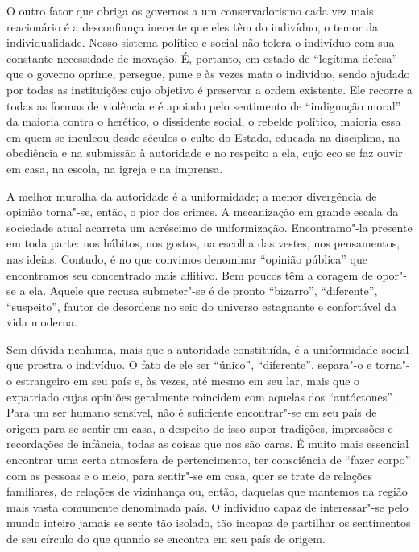 O outro fator que obriga os governos a um conservadorismo cada vez mais
reacionário é a desconfiança inerente que eles têm do indivíduo, o
temor da individualidade. Nosso sistema político e social não tolera o
indivíduo com sua constante necessidade de inovação. É, portanto, em
estado de “legítima defesa” que o governo oprime, persegue, pune e às
vezes mata o indivíduo, sendo ajudado por todas as instituições cujo
objetivo é preservar a ordem existente. Ele recorre a todas as formas
de violência e é apoiado pelo sentimento de “indignação moral” da
maioria contra o herético, o dissidente social, o rebelde político,
maioria essa em quem se inculcou desde séculos o culto do Estado,
educada na disciplina, na obediência e na submissão à autoridade e no
respeito a ela, cujo eco se faz ouvir em casa, na escola, na igreja e
na imprensa.

A melhor muralha da autoridade é a uniformidade; a menor divergência de
opinião torna"-se, então, o pior dos crimes. A mecanização em grande
escala da sociedade atual acarreta um acréscimo de uniformização.
Encontramo"-la presente em toda parte: nos hábitos, nos gostos, na
escolha das vestes, nos pensamentos, nas ideias. Contudo, é no que
convimos denominar “opinião pública” que encontramos seu concentrado
mais aflitivo. Bem poucos têm a coragem de opor"-se a ela. Aquele que
recusa submeter"-se é de pronto “bizarro”, “diferente”, “suspeito”,
fautor de desordens no seio do universo estagnante e confortável da
vida moderna.

Sem dúvida nenhuma, mais que a autoridade constituída, é a
uniformidade social que prostra o indivíduo. O fato de ele ser “único”,
“diferente”, separa"-o e torna"-o estrangeiro em seu país e, às vezes, até mesmo
em seu lar, mais que o expatriado cujas opiniões geralmente
coincidem com aquelas dos “autóctones”. Para um ser humano sensível,
não é suficiente encontrar"-se em seu país de origem para se sentir em
casa, a despeito de isso supor tradições, impressões e recordações de
infância, todas as coisas que nos são caras. É muito mais essencial
encontrar uma certa atmosfera de pertencimento, ter consciência de
“fazer corpo” com as pessoas e o meio, para sentir"-se em casa, quer
se trate de relações familiares, de relações de vizinhança ou, então,
daquelas que mantemos na região mais vasta comumente denominada país. O
indivíduo capaz de interessar"-se pelo mundo inteiro jamais se sente
tão isolado, tão incapaz de partilhar os sentimentos de seu círculo
do que quando se encontra em seu país de origem.


